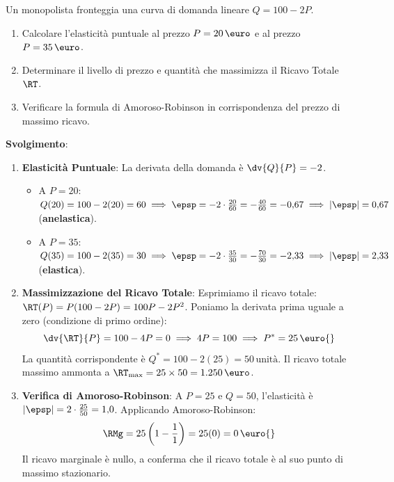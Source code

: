\begin{esercizio}
Un monopolista fronteggia una curva di domanda lineare $Q = 100 - 2P$.
\begin{enumerate}
    \item Calcolare l'elasticità puntuale al prezzo $P = 20\,\text{\euro}$ e al prezzo $P = 35\,\text{\euro}$.
    \item Determinare il livello di prezzo e quantità che massimizza il Ricavo Totale $\RT$.
    \item Verificare la formula di Amoroso-Robinson in corrispondenza del prezzo di massimo ricavo.
\end{enumerate}

\textbf{Svolgimento}:
\begin{enumerate}
    \item \textbf{Elasticità Puntuale}:
    La derivata della domanda è $\dv{Q}{P} = -2$.
    \begin{itemize}
        \item A $P = 20$: $Q(20) = 100 - 2(20) = 60 \implies \epsp = -2 \cdot \frac{20}{60} = -\frac{40}{60} = -0{,}67 \implies |\epsp| = 0{,}67$ (\textbf{anelastica}).
        \item A $P = 35$: $Q(35) = 100 - 2(35) = 30 \implies \epsp = -2 \cdot \frac{35}{30} = -\frac{70}{30} = -2{,}33 \implies |\epsp| = 2{,}33$ (\textbf{elastica}).
    \end{itemize}
    
    \item \textbf{Massimizzazione del Ricavo Totale}:
    Esprimiamo il ricavo totale: $\RT(P) = P(100 - 2P) = 100P - 2P^2$.
    Poniamo la derivata prima uguale a zero (condizione di primo ordine):
    \begin{equation}
        \dv{\RT}{P} = 100 - 4P = 0 \implies 4P = 100 \implies P^* = 25\,\text{\euro{}}
    \end{equation}
    La quantità corrispondente è $Q^* = 100 - 2(25) = 50\,\text{unità}$.
    Il ricavo totale massimo ammonta a $\RT_{\max} = 25 \times 50 = 1.250\,\text{\euro}$.
    
    \item \textbf{Verifica di Amoroso-Robinson}:
    A $P = 25$ e $Q = 50$, l'elasticità è $|\epsp| = 2 \cdot \frac{25}{50} = 1{,}0$.
    Applicando Amoroso-Robinson:
    \begin{equation}
        \RMg = 25 \left( 1 - \frac{1}{1} \right) = 25(0) = 0\,\text{\euro{}}
    \end{equation}
    Il ricavo marginale è nullo, a conferma che il ricavo totale è al suo punto di massimo stazionario.
\end{enumerate}
\end{esercizio}

